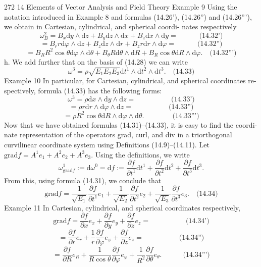 272 14 Elements of Vector Analysis and Field Theory
Example 9 Using the notation introduced in Example 8 and formulas (14.26'),
(14.26'') and (14.26'''), we obtain in Cartesian, cylindrical, and spherical coordi-
nates respectively
$$\omega^2_B = B_x \mathrm{d}y \wedge \mathrm{d}z + B_y \mathrm{d}z \wedge \mathrm{d}x + B_z \mathrm{d}x \wedge \mathrm{d}y = \quad \quad \quad \text{(14.32')}$$
$$= B_r r \mathrm{d}\varphi \wedge \mathrm{d}z + B_z \mathrm{d}z \wedge \mathrm{d}r + B_z r \mathrm{d}r \wedge \mathrm{d}\varphi = \quad \quad \quad \text{(14.32'')}$$
$$= B_R R^2 \cos \theta \mathrm{d}\varphi \wedge \mathrm{d}\theta + B_\theta R \mathrm{d}\theta \wedge \mathrm{d}R + B_R \cos \theta \mathrm{d}R \wedge \mathrm{d}\varphi. \quad \text{(14.32''')}$$
h.
We add further that on the basis of (14.28) we can write
$$\omega^3 = \rho \sqrt{E_1 E_2 E_3} \mathrm{d}t^1 \wedge \mathrm{d}t^2 \wedge \mathrm{d}t^3. \quad \text{(14.33)}$$
Example 10 In particular, for Cartesian, cylindrical, and spherical coordinates re-
spectively, formula (14.33) has the following forms:
$$\omega^3 = \rho \mathrm{d}x \wedge \mathrm{d}y \wedge \mathrm{d}z = \quad \quad \quad \quad \quad \text{(14.33')}$$
$$= \rho r \mathrm{d}r \wedge \mathrm{d}\varphi \wedge \mathrm{d}z = \quad \quad \quad \quad \quad \text{(14.33'')}$$
$$= \rho R^2 \cos \theta \mathrm{d}R \wedge \mathrm{d}\varphi \wedge \mathrm{d}\theta. \quad \quad \quad \quad \text{(14.33''')}$$
Now that we have obtained formulas (14.31)–(14.33), it is easy to find the coordi-
nate representation of the operators grad, curl, and div in a triorthogonal curvilinear
coordinate system using Definitions (14.9)–(14.11).
Let $\mathrm{grad} f = A^1e_1 + A^2e_2 + A^3e_3$. Using the definitions, we write
$$\omega^1_{\mathrm{grad} f} := \mathrm{d}\omega^0 = \mathrm{d}f := \frac{\partial f}{\partial t^1} \mathrm{d}t^1 + \frac{\partial f}{\partial t^2} \mathrm{d}t^2 + \frac{\partial f}{\partial t^3} \mathrm{d}t^3.$$
From this, using formula (14.31), we conclude that
$$\mathrm{grad} f = \frac{1}{\sqrt{E_1}}\frac{\partial f}{\partial t^1} e_1 + \frac{1}{\sqrt{E_2}}\frac{\partial f}{\partial t^2} e_2 + \frac{1}{\sqrt{E_3}}\frac{\partial f}{\partial t^3} e_3. \quad \text{(14.34)}$$
Example 11 In Cartesian, cylindrical, and spherical coordinates respectively,
$$\mathrm{grad} f = \frac{\partial f}{\partial x} e_x + \frac{\partial f}{\partial y} e_y + \frac{\partial f}{\partial z} e_z = \quad \quad \quad \quad \quad \text{(14.34')}$$
$$= \frac{\partial f}{\partial r} e_r + \frac{1}{r}\frac{\partial f}{\partial \varphi} e_\varphi + \frac{\partial f}{\partial z} e_z = \quad \quad \quad \quad \quad \text{(14.34'')}$$
$$= \frac{\partial f}{\partial R} e_R + \frac{1}{R\cos\theta}\frac{\partial f}{\partial \varphi} e_\varphi + \frac{1}{R^2}\frac{\partial f}{\partial \theta} e_\theta. \quad \quad \quad \text{(14.34''')}$$